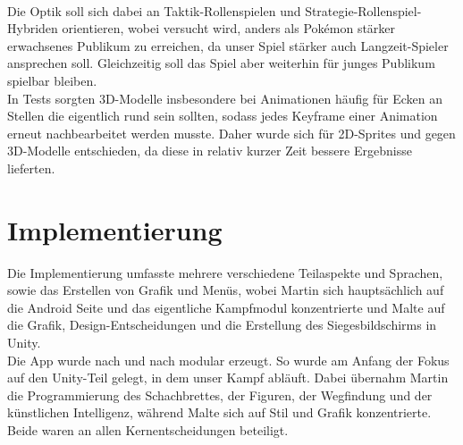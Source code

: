 \documentclass[extern,palatino]{cgBA}
\begin{document}
\\Die Optik soll sich dabei an Taktik-Rollenspielen und Strategie-Rollenspiel-Hybriden orientieren, wobei versucht wird, anders als Pokémon stärker erwachsenes Publikum zu erreichen, da unser Spiel stärker auch Langzeit-Spieler ansprechen soll. Gleichzeitig soll das Spiel aber weiterhin für junges Publikum spielbar bleiben.
\\In Tests sorgten 3D-Modelle insbesondere bei Animationen häufig für Ecken an Stellen die eigentlich rund sein sollten, sodass jedes Keyframe einer Animation erneut nachbearbeitet werden musste. Daher wurde sich für 2D-Sprites und gegen 3D-Modelle entschieden, da diese in relativ kurzer Zeit bessere Ergebnisse lieferten.
\newpage
\section{Implementierung}
Die Implementierung umfasste mehrere verschiedene Teilaspekte und Sprachen, sowie das Erstellen von Grafik und Menüs, wobei Martin sich hauptsächlich auf die Android Seite und das eigentliche Kampfmodul konzentrierte und Malte auf die Grafik, Design-Entscheidungen und die Erstellung des Siegesbildschirms in Unity.
\\Die App wurde nach und nach modular erzeugt. So wurde am Anfang der Fokus auf den Unity-Teil gelegt, in dem unser Kampf abläuft. Dabei übernahm Martin die Programmierung des Schachbrettes, der Figuren, der Wegfindung und der künstlichen Intelligenz, während Malte sich auf Stil und Grafik konzentrierte. Beide waren an allen Kernentscheidungen beteiligt.
\end{document}

